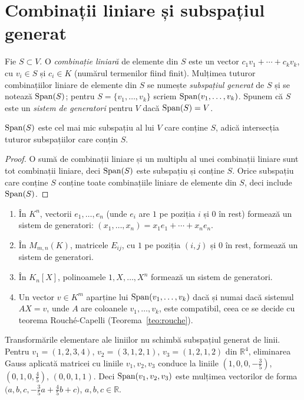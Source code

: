 \section{Combinații liniare și subspațiul generat}

\begin{definitie}
Fie $S\subset V$. O \emph{combinație liniară} de elemente din $S$ este un vector $c_1v_1+\cdots+c_kv_k$, cu $v_i\in S$ și $c_i\in K$ (numărul termenilor fiind finit). Mulțimea tuturor combinațiilor liniare de elemente din $S$ se numește \emph{subspațiul generat} de $S$ și se notează $\operatorname{Span}(S)$; pentru $S=\{v_1,\dots,v_k\}$ scriem $\operatorname{Span}(v_1,\dots,v_k)$. Spunem că $S$ este un \emph{sistem de generatori} pentru $V$ dacă $\operatorname{Span}(S)=V$.
\end{definitie}

\begin{propozitie}
$\operatorname{Span}(S)$ este cel mai mic subspațiu al lui $V$ care conține $S$, adică intersecția tuturor subspațiilor care conțin $S$.
\end{propozitie}

\begin{proof}
O sumă de combinații liniare și un multiplu al unei combinații liniare sunt tot combinații liniare, deci $\operatorname{Span}(S)$ este subspațiu și conține $S$. Orice subspațiu care conține $S$ conține toate combinațiile liniare de elemente din $S$, deci include $\operatorname{Span}(S)$.
\end{proof}

\begin{exemplu}
\begin{enumerate}
\item În $K^n$, vectorii $e_1,\dots,e_n$ (unde $e_i$ are $1$ pe poziția $i$ și $0$ în rest) formează un sistem de generatori: $(x_1,\dots,x_n)=x_1e_1+\cdots+x_ne_n$.
\item În $M_{m,n}(K)$, matricele $E_{ij}$, cu $1$ pe poziția $(i,j)$ și $0$ în rest, formează un sistem de generatori.
\item În $K_n[X]$, polinoamele $1,X,\dots,X^n$ formează un sistem de generatori.
\item Un vector $v\in K^m$ aparține lui $\operatorname{Span}(v_1,\dots,v_k)$ dacă și numai dacă sistemul $AX=v$, unde $A$ are coloanele $v_1,\dots,v_k$, este compatibil, ceea ce se decide cu teorema Rouché-Capelli (Teorema~\ref{teo:rouche}).
\end{enumerate}
\end{exemplu}

\begin{exemplu}
Transformările elementare ale liniilor nu schimbă subspațiul generat de linii. Pentru $v_1=(1,2,3,4)$, $v_2=(3,1,2,1)$, $v_3=(1,2,1,2)$ din $\mathbb{R}^4$, eliminarea Gauss aplicată matricei cu liniile $v_1,v_2,v_3$ conduce la liniile $(1,0,0,-\frac35)$, $(0,1,0,\frac45)$, $(0,0,1,1)$. Deci $\operatorname{Span}(v_1,v_2,v_3)$ este mulțimea vectorilor de forma $\bigl(a,b,c,-\frac35a+\frac45b+c\bigr)$, $a,b,c\in\mathbb{R}$.
\end{exemplu}

